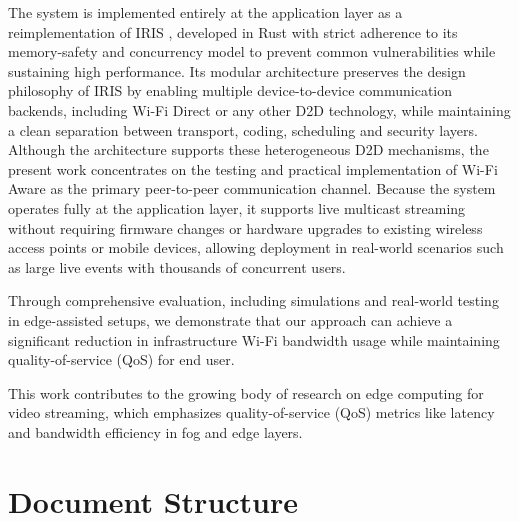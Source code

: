 \quad The system is implemented entirely at the application layer as a reimplementation of IRIS \cite{martins2018iris}, developed in Rust with strict adherence to its memory-safety and concurrency model to prevent common vulnerabilities while sustaining high performance. Its modular architecture preserves the design philosophy of IRIS by enabling multiple device-to-device communication backends, including Wi-Fi Direct or any other D2D technology, while maintaining a clean separation between transport, coding, scheduling and security layers. Although the architecture supports these heterogeneous D2D mechanisms, the present work concentrates on the testing and practical implementation of Wi-Fi Aware as the primary peer-to-peer communication channel. Because the system operates fully at the application layer, it supports live multicast streaming without requiring firmware changes or hardware upgrades to existing wireless access points or mobile devices, allowing deployment in real-world scenarios such as large live events with thousands of concurrent users.

\quad Through comprehensive evaluation, including simulations and real-world testing in edge-assisted setups, we demonstrate that our approach can achieve a significant reduction in infrastructure Wi-Fi bandwidth usage while maintaining quality-of-service (QoS) for end user. 

\quad This work contributes to the growing body of research on edge computing for video streaming, which emphasizes quality-of-service (QoS) metrics like latency and bandwidth efficiency in fog and edge layers.

\section{Document Structure}



